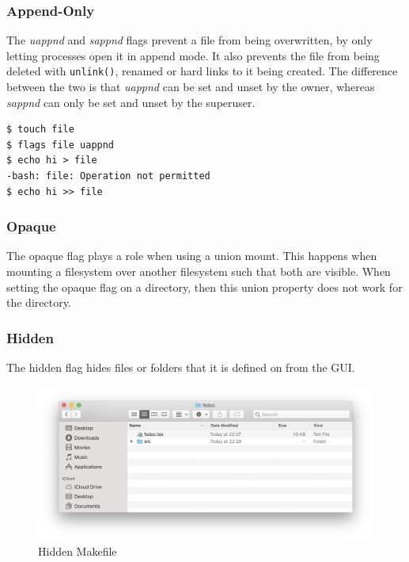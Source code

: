 \documentclass[a4paper]{article}
\begin{document}
\subsubsection{Append-Only}

The \emph{uappnd} and \emph{sappnd} flags prevent a file from being overwritten, by only letting processes open it in append mode. It also prevents the file from being deleted with \verb|unlink()|, renamed or hard links to it being created. The difference between the two is that \emph{uappnd} can be set and unset by the owner, whereas \emph{sappnd} can only be set and unset by the superuser.

\begin{verbatim}
$ touch file
$ flags file uappnd
$ echo hi > file
-bash: file: Operation not permitted
$ echo hi >> file
\end{verbatim}

\subsubsection{Opaque}

The opaque flag plays a role when using a union mount. This happens when mounting a filesystem over another filesystem such that both are visible. When setting the opaque flag on a directory, then this union property does not work for the directory.


\subsubsection{Hidden}

The hidden flag hides files or folders that it is defined on from the GUI. 

\begin{figure}
\centering\caption{Hidden Makefile}\label{fig:macoshidden}
\includegraphics[width=12cm]{img/hidden}  
\end{figure}
\end{document}
